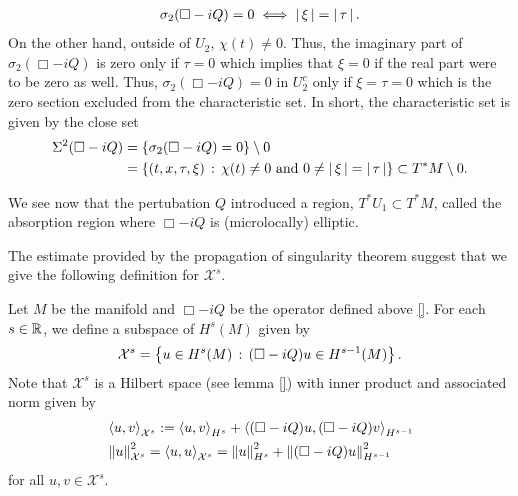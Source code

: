 \documentclass[12pt]{article}
\begin{document}
\begin{align*}
\sigma_2(\Box - iQ) = 0 \iff \abs{\xi} = \abs{\tau}. 
\end{align*} 
On the other hand, outside of $U_2$, $\chi(t) \neq 0 $. Thus, the imaginary part of $\sigma_2(\Box - iQ)$ is zero only if $\tau = 0$ which implies that $\xi = 0$ if the real part were to be zero as well. Thus, $\sigma_2(\Box - iQ) = 0$ in $U_2^c$ only if $\xi = \tau = 0$ which is the zero section excluded from the characteristic set. In short, the characteristic set is given by the close set 
\begin{align*}
\Char^2(\Box - iQ) 
& = \set{\sigma_2(\Box - iQ) = 0} \setminus 0 \\
& = \set{(t, x, \tau, \xi) \wh \chi(t) \neq 0 \text{ and }  0 \neq \abs{\xi} = \abs{\tau}} \subset T^* M \setminus 0. 
\end{align*}

We see now that the pertubation $Q$ introduced a region, $T^*U_1 \subset T^*M$, called the absorption region where $\Box - iQ$ is (microlocally) elliptic. 


The estimate provided by the propagation of singularity theorem suggest that we give the following definition for $\mathcal{X}^s$. 

\begin{fdefinition}
    Let $M$ be the manifold and $\Box -i Q$ be the operator defined above \ref{}. For each $s \in \R$, we define a subspace of $H^{s}(M)$ given by
    \begin{align*}
    \mathcal{X}^s = \set{u \in H^s(M) \wh (\Box - i Q)u \in H^{s - 1}(M)}. 
    \end{align*}
    Note that $\mathcal{X}^s$ is a Hilbert space (see lemma \ref{}) with inner product and associated norm given by 
    \begin{align*}
    &\inprod[u, v]_{\mathcal{X}^s} := \inprod[u, v]_{H^{s}} + \inprod[(\Box - iQ)u, (\Box - iQ)v]_{H^{s -1}} \\
    & \norm[u]_{\mathcal{X}^s}^2 = \inprod[u, u]_{\mathcal{X}^s} = \norm[u]_{H^s}^2 + \norm[(\Box - iQ)u]_{H^{s - 1}}^2
    \end{align*}
    for all $u, v \in \mathcal{X}^s$. 
\end{fdefinition}
\end{document}
